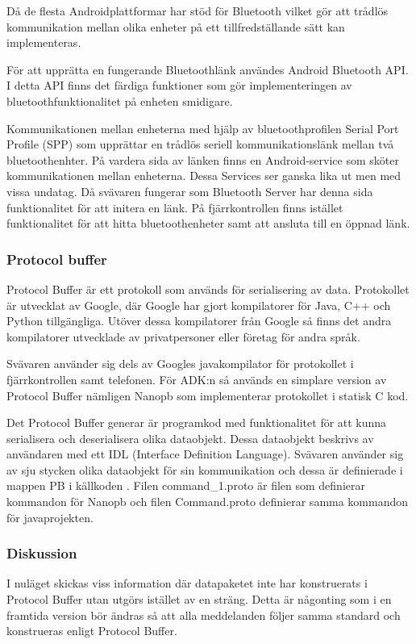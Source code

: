 Då de flesta Androidplattformar har stöd för Bluetooth vilket gör att trådlös
kommunikation mellan olika enheter på ett tillfredställande sätt kan implementeras. 

För att upprätta en fungerande Bluetoothlänk användes Android Bluetooth API. I detta API finns det färdiga funktioner som gör implementeringen av bluetoothfunktionalitet på enheten smidigare. 

Kommunikationen mellan enheterna med hjälp av bluetoothprofilen Serial Port
Profile (SPP) som upprättar en trådlös seriell kommunikationslänk mellan två bluetoothenhter.
På vardera sida av länken finns en Android-service som sköter kommunikationen mellan enheterna. Dessa Services ser ganska lika ut men med vissa undatag. Då svävaren fungerar som Bluetooth Server har denna sida funktionalitet för att initera en länk. På fjärrkontrollen finns istället funktionalitet för att hitta bluetoothenheter samt att ansluta till en öppnad länk.


\subsubsection{Protocol buffer}
\label{komlank:ProtocolBuffer}
Protocol Buffer\cite{Protocol buffer} är ett protokoll som används för
serialisering av data.
Protokollet är utvecklat av Google, där Google har gjort kompilatorer för Java,
C++ och Python tillgängliga. Utöver dessa kompilatorer från Google så finns det
andra kompilatorer utvecklade av privatpersoner eller företag för andra språk.

Svävaren använder sig dels av Googles javakompilator för protokollet i 
fjärrkontrollen samt telefonen. För ADK:n så används en simplare version av
Protocol Buffer nämligen Nanopb \cite{Nanopb} som implementerar protokollet i
statisk C kod.

Det Protocol Buffer generar är programkod med funktionalitet för att kunna
serialisera och deserialisera olika dataobjekt. Dessa dataobjekt beskrivs av
användaren med ett IDL (Interface Definition Language).
Svävaren använder sig av sju stycken olika dataobjekt för sin kommunikation och
dessa är definierade i mappen PB i källkoden \cite{Source code}. Filen
command\_1.proto är filen som definierar kommandon för Nanopb och filen
Command.proto definierar samma kommandon för javaprojekten.

\subsubsection{Diskussion}
I nuläget skickas viss information där datapaketet inte har konstruerats i Protocol Buffer utan utgörs istället av 
en sträng. Detta är någonting som i en framtida version bör ändras så att alla meddelanden följer samma standard och 
konstrueras enligt Protocol Buffer. 

